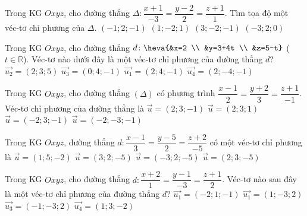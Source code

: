 \begin{ex}%
	Trong KG $Oxyz$, cho đường thẳng $\Delta \colon \dfrac{x+1}{-3}=\dfrac{y-2}{2}=\dfrac{z+1}{1}$. Tìm tọa độ một véc-tơ chỉ phương của $\Delta$.
	\choice
	{$(-1;2;-1)$}
	{$(1;-2;1)$}
	{\True $(3;-2;-1)$}
	{$(-3;2;0)$}
\end{ex}

\begin{ex}%
	Trong KG $Oxyz$, cho đường thẳng $d \colon \heva{&x=2 \\ &y=3+4t \\ &z=5-t}$ ($t \in \mathbb{R}$). Véc-tơ nào dưới đây là một véc-tơ chỉ phương của đường thẳng $d$?
	\choice
	{$\overrightarrow{u_2}=(2;3;5)$}
	{\True $\overrightarrow{u_3}=(0;4;-1)$}
	{$\overrightarrow{u_1}=(2;4;-1)$}
	{$\overrightarrow{u_4}=(2;-4;-1)$}
\end{ex}

\begin{ex}%
	Trong KG $Oxyz$, cho đường thẳng $(\Delta)$ có phương trình $\dfrac{x-1}{2}=\dfrac{y+2}{3}=\dfrac{z+1}{-1}$. Véc-tơ chỉ phương của đường thẳng là
	\choice
	{\True $\overrightarrow{u}=(2;3;-1)$}
	{$\overrightarrow{u}=(2;3;1)$}
	{$\overrightarrow{u}=(-2;3;-1)$}
	{$\overrightarrow{u}=(-2;-3;-1)$}
\end{ex}

\begin{ex}%
	Trong KG $Oxyz$, đường thẳng $d \colon \dfrac{x-1}{3}=\dfrac{y-5}{2}=\dfrac{z+2}{-5}$ có một véc-tơ chỉ phương là
	\choice
	{$\overrightarrow{u}=(1;5;-2)$}
	{\True $\overrightarrow{u}=(3;2;-5)$}
	{$\overrightarrow{u}=(-3;2;-5)$}
	{$\overrightarrow{u}=(2;3;-5)$}
\end{ex}
\begin{ex}%
	Trong KG $Oxyz$, cho đường thẳng $d \colon \dfrac{x+2}{1}=\dfrac{y-1}{-3}=\dfrac{z+1}{2}$. Véc-tơ nào sau đây là một véc-tơ chỉ phương của đường thẳng $d$?
	\choice
	{$\overrightarrow{u_1}=(-2;1;-1)$}
	{\True $\overrightarrow{u_1}=(1;-3;2)$}
	{$\overrightarrow{u_3}=(-1;-3;2)$}
	{$\overrightarrow{u_4}=(1;3;-2)$}
\end{ex}

